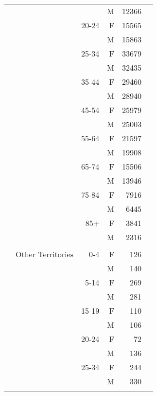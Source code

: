 \begin{tabular}{@{}c@{}rrrr@{}c@{}}
\phantom{.} &                                &        &  M &   12366 &\tabularnewline\relax 
\phantom{.} &                                &  20-24 &  F &   15565 &\tabularnewline\relax 
\phantom{.} &                                &        &  M &   15863 &\tabularnewline\relax 
\phantom{.} &                                &  25-34 &  F &   33679 &\tabularnewline\relax 
\phantom{.} &                                &        &  M &   32435 &\tabularnewline\relax 
\phantom{.} &                                &  35-44 &  F &   29460 &\tabularnewline\relax 
\phantom{.} &                                &        &  M &   28940 &\tabularnewline\relax 
\phantom{.} &                                &  45-54 &  F &   25979 &\tabularnewline\relax 
\phantom{.} &                                &        &  M &   25003 &\tabularnewline\relax 
\phantom{.} &                                &  55-64 &  F &   21597 &\tabularnewline\relax 
\phantom{.} &                                &        &  M &   19908 &\tabularnewline\relax 
\phantom{.} &                                &  65-74 &  F &   15506 &\tabularnewline\relax 
\phantom{.} &                                &        &  M &   13946 &\tabularnewline\relax 
\phantom{.} &                                &  75-84 &  F &    7916 &\tabularnewline\relax 
\phantom{.} &                                &        &  M &    6445 &\tabularnewline\relax 
\phantom{.} &                                &    85+ &  F &    3841 &\tabularnewline\relax 
\phantom{.} &                                &        &  M &    2316 &\tabularnewline\relax 
\phantom{.} &            &            &            &            &\tabularnewline[0.5\baselineskip]
\phantom{.} &              Other Territories &    0-4 &  F &     126 &\tabularnewline\relax 
\phantom{.} &                                &        &  M &     140 &\tabularnewline\relax 
\phantom{.} &                                &   5-14 &  F &     269 &\tabularnewline\relax 
\phantom{.} &                                &        &  M &     281 &\tabularnewline\relax 
\phantom{.} &                                &  15-19 &  F &     110 &\tabularnewline\relax 
\phantom{.} &                                &        &  M &     106 &\tabularnewline\relax 
\phantom{.} &                                &  20-24 &  F &      72 &\tabularnewline\relax 
\phantom{.} &                                &        &  M &     136 &\tabularnewline\relax 
\phantom{.} &                                &  25-34 &  F &     244 &\tabularnewline\relax 
\phantom{.} &                                &        &  M &     330 &\tabularnewline\relax 

\end{tabular}
